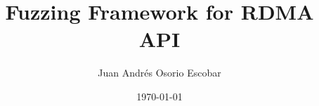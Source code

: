\documentclass[a4paper]{article}
\begin{document}
\title{Fuzzing Framework for RDMA API}
\author{Juan Andrés Osorio Escobar}
\date{\today}
\maketitle



\tableofcontents


% 








\end{document}
